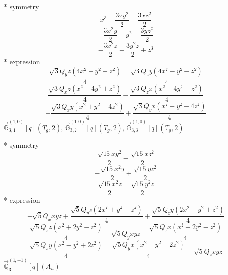 \documentclass[fleqn,8pt]{jsarticle}
\begin{document}
\noindent\quad ** symmetry
\begin{dmath*}
x^{3} - \frac{3 x y^{2}}{2} - \frac{3 x z^{2}}{2}
\end{dmath*}
\begin{dmath*}
- \frac{3 x^{2} y}{2} + y^{3} - \frac{3 y z^{2}}{2}
\end{dmath*}
\begin{dmath*}
- \frac{3 x^{2} z}{2} - \frac{3 y^{2} z}{2} + z^{3}
\end{dmath*}
\noindent\quad ** expression
\begin{dmath*}
\frac{\sqrt{3} Q_{y} z \left(4 x^{2} - y^{2} - z^{2}\right)}{4} - \frac{\sqrt{3} Q_{z} y \left(4 x^{2} - y^{2} - z^{2}\right)}{4}
\end{dmath*}
\begin{dmath*}
\frac{\sqrt{3} Q_{x} z \left(x^{2} - 4 y^{2} + z^{2}\right)}{4} - \frac{\sqrt{3} Q_{z} x \left(x^{2} - 4 y^{2} + z^{2}\right)}{4}
\end{dmath*}
\begin{dmath*}
- \frac{\sqrt{3} Q_{x} y \left(x^{2} + y^{2} - 4 z^{2}\right)}{4} + \frac{\sqrt{3} Q_{y} x \left(x^{2} + y^{2} - 4 z^{2}\right)}{4}
\end{dmath*}
\noindent\quad $\vec{\mathbb{G}}_{3,1}^{(1,0)}[q](T_{g},2)$, $\vec{\mathbb{G}}_{3,2}^{(1,0)}[q](T_{g},2)$, $\vec{\mathbb{G}}_{3,3}^{(1,0)}[q](T_{g},2)$

\noindent\quad ** symmetry
\begin{dmath*}
\frac{\sqrt{15} x y^{2}}{2} - \frac{\sqrt{15} x z^{2}}{2}
\end{dmath*}
\begin{dmath*}
- \frac{\sqrt{15} x^{2} y}{2} + \frac{\sqrt{15} y z^{2}}{2}
\end{dmath*}
\begin{dmath*}
\frac{\sqrt{15} x^{2} z}{2} - \frac{\sqrt{15} y^{2} z}{2}
\end{dmath*}
\noindent\quad ** expression
\begin{dmath*}
- \sqrt{5} Q_{x} x y z + \frac{\sqrt{5} Q_{y} z \left(2 x^{2} + y^{2} - z^{2}\right)}{4} + \frac{\sqrt{5} Q_{z} y \left(2 x^{2} - y^{2} + z^{2}\right)}{4}
\end{dmath*}
\begin{dmath*}
\frac{\sqrt{5} Q_{x} z \left(x^{2} + 2 y^{2} - z^{2}\right)}{4} - \sqrt{5} Q_{y} x y z - \frac{\sqrt{5} Q_{z} x \left(x^{2} - 2 y^{2} - z^{2}\right)}{4}
\end{dmath*}
\begin{dmath*}
\frac{\sqrt{5} Q_{x} y \left(x^{2} - y^{2} + 2 z^{2}\right)}{4} - \frac{\sqrt{5} Q_{y} x \left(x^{2} - y^{2} - 2 z^{2}\right)}{4} - \sqrt{5} Q_{z} x y z
\end{dmath*}
\noindent\quad $\vec{\mathbb{Q}}_{3}^{(1,-1)}[q](A_{u})$
\end{document}
